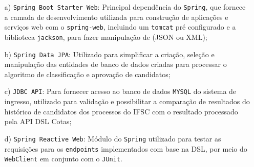 \begin{enumerate}
 
\item[a)] \texttt{Spring Boot Starter Web}: Principal dependência do \texttt{Spring}, que fornece a camada de desenvolvimento utilizada para construção de aplicações e serviços web com o \texttt{spring-web}, incluindo um \texttt{tomcat} pré configurado e a biblioteca \texttt{jackson}, para fazer manipulação de (JSON ou XML);


\item[b)] \texttt{Spring Data JPA}:  Utilizado para simplificar a criação, seleção e manipulação das entidades de banco de dados criadas para processar o algoritmo de classificação e aprovação de candidatos; 

\item[c)] \texttt{JDBC API}: Para fornecer acesso ao banco de dados \texttt{MYSQL} do sistema de ingresso, utilizado para validação e possibilitar a comparação de resultados do histórico de candidatos dos processos do \gls{IFSC} com o resultado processado pela \gls{API} DSL Cotas; 


\item[d)] \texttt{Spring Reactive Web}: Módulo do \texttt{Spring} utilizado para testar as requisições para os \texttt{endpoints} implementados com base na DSL, por meio do \texttt{WebClient} em conjunto com o \texttt{JUnit}.

\end{enumerate}

